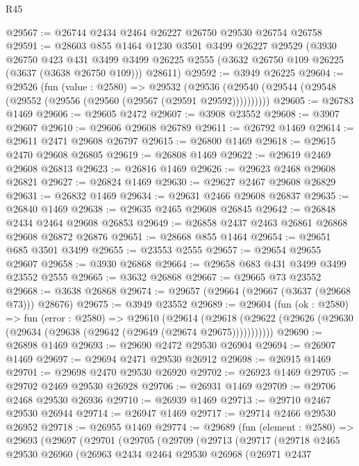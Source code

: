 \begin{lexlean}{R45}
\begin{coremodule}
@29567 := @26744 @2434 @2464 @26227 @26750 @29530 @26754 @26758
@29591 := @28603
    @855
    @1464
    @1230
    @3501
    @3499
    @26227
    @29529
    (@3930
      @26750
      @423
      @431
      @3499
      @3499
      @26225
      @2555
      (@3632 @26750 @109 @26225 (@3637 (@3638 @26750 @109)))
      @28611)
@29592 := @3949 @26225
@29604 := @29526
    (fun (value : @2580) =>
    @29532 (@29536 (@29540 (@29544 (@29548 (@29552 (@29556 (@29560 (@29567 (@29591 @29592))))))))))
@29605 := @26783 @1469
@29606 := @29605 @2472
@29607 := @3908 @23552
@29608 := @3907 @29607
@29610 := @29606 @29608 @26789
@29611 := @26792 @1469
@29614 := @29611 @2471 @29608 @26797
@29615 := @26800 @1469
@29618 := @29615 @2470 @29608 @26805
@29619 := @26808 @1469
@29622 := @29619 @2469 @29608 @26813
@29623 := @26816 @1469
@29626 := @29623 @2468 @29608 @26821
@29627 := @26824 @1469
@29630 := @29627 @2467 @29608 @26829
@29631 := @26832 @1469
@29634 := @29631 @2466 @29608 @26837
@29635 := @26840 @1469
@29638 := @29635 @2465 @29608 @26845
@29642 := @26848 @2434 @2464 @29608 @26853
@29649 := @26858 @2437 @2463 @26861 @26868 @29608 @26872 @26876
@29651 := @28668 @855 @1464
@29654 := @29651 @685 @3501 @3499
@29655 := @23553 @2555
@29657 := @29654 @29655 @29607
@29658 := @3930 @26868
@29664 := @29658 @683 @431 @3499 @3499 @23552 @2555
@29665 := @3632 @26868
@29667 := @29665 @73 @23552
@29668 := @3638 @26868
@29674 := @29657 (@29664 (@29667 (@3637 (@29668 @73))) @28676)
@29675 := @3949 @23552
@29689 := @29604
    (fun (ok : @2580) =>
    fun (error : @2580) =>
    @29610
      (@29614
        (@29618 (@29622 (@29626 (@29630 (@29634 (@29638 (@29642 (@29649 (@29674 @29675)))))))))))
@29690 := @26898 @1469
@29693 := @29690 @2472 @29530 @26904
@29694 := @26907 @1469
@29697 := @29694 @2471 @29530 @26912
@29698 := @26915 @1469
@29701 := @29698 @2470 @29530 @26920
@29702 := @26923 @1469
@29705 := @29702 @2469 @29530 @26928
@29706 := @26931 @1469
@29709 := @29706 @2468 @29530 @26936
@29710 := @26939 @1469
@29713 := @29710 @2467 @29530 @26944
@29714 := @26947 @1469
@29717 := @29714 @2466 @29530 @26952
@29718 := @26955 @1469
@29774 := @29689
    (fun (element : @2580) =>
    @29693
      (@29697
        (@29701
          (@29705
            (@29709
              (@29713
                (@29717
                  (@29718
                    @2465
                    @29530
                    @26960
                    (@26963
                      @2434
                      @2464
                      @29530
                      @26968
                      (@26971
                        @2437

\end{coremodule}
\end{lexlean}
